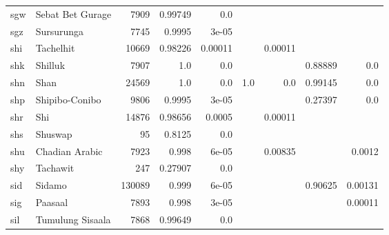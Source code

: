 \documentclass[11pt]{article}
\begin{document}
\begin{table*}[h]
{\begin{tabular}{llrrrrrrr}
sgw         & Sebat Bet Gurage         & 7909         & 0.99749         & 0.0         &          &          &          &          \\

sgz         & Sursurunga         & 7745         & 0.9995         & 3e-05         &          &          &          &          \\

shi         & Tachelhit         & 10669         & 0.98226         & 0.00011         &          & 0.00011         &          &          \\

shk         & Shilluk         & 7907         & 1.0         & 0.0         &          &          & 0.88889         & 0.0         \\

shn         & Shan         & 24569         & 1.0         & 0.0         & 1.0         & 0.0         & 0.99145         & 0.0         \\

shp         & Shipibo-Conibo         & 9806         & 0.9995         & 3e-05         &          &          & 0.27397         & 0.0         \\

shr         & Shi         & 14876         & 0.98656         & 0.0005         &          & 0.00011         &          &          \\

shs         & Shuswap         & 95         & 0.8125         & 0.0         &          &          &          &          \\

shu         & Chadian Arabic         & 7923         & 0.998         & 6e-05         &          & 0.00835         &          & 0.0012         \\

shy         & Tachawit         & 247         & 0.27907         & 0.0         &          &          &          &          \\

sid         & Sidamo         & 130089         & 0.999         & 6e-05         &          &          & 0.90625         & 0.00131         \\

sig         & Paasaal         & 7893         & 0.998         & 3e-05         &          &          &          & 0.00011         \\

sil         & Tumulung Sisaala         & 7868         & 0.99649         & 0.0         &          &          &          &          \\


\end{tabular}}
\end{table*}
\end{document}
